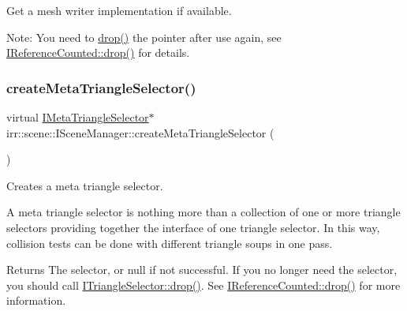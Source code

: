 Get a mesh writer implementation if available. 

Note\+: You need to \hyperlink{classirr_1_1IReferenceCounted_a03856a09355b89d178090c4a5f738543}{drop()} the pointer after use again, see \hyperlink{classirr_1_1IReferenceCounted_a03856a09355b89d178090c4a5f738543}{I\+Reference\+Counted\+::drop()} for details. \mbox{\label{classirr_1_1scene_1_1ISceneManager_aee99e59dc55fe9f8c3507df68f84a9ff}} 
\subsubsection{\texorpdfstring{create\+Meta\+Triangle\+Selector()}{createMetaTriangleSelector()}\hspace{0.1cm}{\footnotesize\ttfamily [1/2]}}
{\footnotesize\ttfamily virtual \hyperlink{classirr_1_1scene_1_1IMetaTriangleSelector}{I\+Meta\+Triangle\+Selector}$\ast$ irr\+::scene\+::\+I\+Scene\+Manager\+::create\+Meta\+Triangle\+Selector (\begin{DoxyParamCaption}{ }\end{DoxyParamCaption})\hspace{0.3cm}{\ttfamily [pure virtual]}}



Creates a meta triangle selector. 

A meta triangle selector is nothing more than a collection of one or more triangle selectors providing together the interface of one triangle selector. In this way, collision tests can be done with different triangle soups in one pass. \begin{DoxyReturn}{Returns}
The selector, or null if not successful. If you no longer need the selector, you should call \hyperlink{classirr_1_1IReferenceCounted_a03856a09355b89d178090c4a5f738543}{I\+Triangle\+Selector\+::drop()}. See \hyperlink{classirr_1_1IReferenceCounted_a03856a09355b89d178090c4a5f738543}{I\+Reference\+Counted\+::drop()} for more information. 
\end{DoxyReturn}
\mbox{\label{classirr_1_1scene_1_1ISceneManager_aee99e59dc55fe9f8c3507df68f84a9ff}} 
